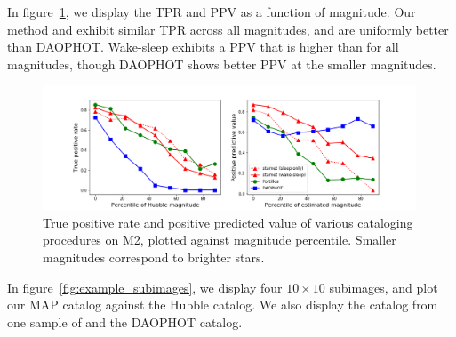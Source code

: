 

In figure~\ref{fig:summary_stats}, we display the TPR and PPV as a function of magnitude. 
Our method and \cite{Feder_2019} exhibit similar TPR across all magnitudes, and are 
uniformly better than DAOPHOT. Wake-sleep exhibits a PPV that is higher than \cite{Feder_2019} for all magnitudes, though DAOPHOT shows better PPV at the smaller magnitudes. 

\begin{figure}[h]
    \centering
    \includegraphics[width=0.99\textwidth]{figures/summary_statistics_m2.png}
    \caption{True positive rate and positive predicted value of various cataloging
    procedures on M2, plotted against magnitude percentile.
    Smaller magnitudes correspond to brighter stars. }
    \label{fig:summary_stats}
\end{figure}

In figure~\ref{fig:example_subimages}, we display four $10\times10$ subimages, and plot 
our MAP catalog against the Hubble catalog. We also display the catalog from one sample of \cite{Feder_2019} and the DAOPHOT catalog. 

